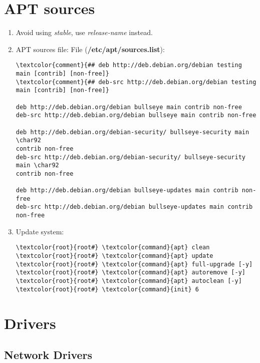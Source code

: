 \documentclass[10pt, a4paper, onecolumn, openany]{book} %
\begin{document}
\section{APT sources}
\begin{enumerate}
    \item Avoid using \textit{stable}, use \textit{release-name} instead.
    \item APT sources file:
\newline File (\textbf{\textcolor{file}{/etc/apt/sources.list}}):
\begin{Verbatim}[commandchars=\\\{\}]
\textcolor{comment}{## deb http://deb.debian.org/debian testing main [contrib] [non-free]}
\textcolor{comment}{## deb-src http://deb.debian.org/debian testing main [contrib] [non-free]}

deb http://deb.debian.org/debian bullseye main contrib non-free
deb-src http://deb.debian.org/debian bullseye main contrib non-free

deb http://deb.debian.org/debian-security/ bullseye-security main \char92
contrib non-free
deb-src http://deb.debian.org/debian-security/ bullseye-security main \char92
contrib non-free

deb http://deb.debian.org/debian bullseye-updates main contrib non-free
deb-src http://deb.debian.org/debian bullseye-updates main contrib non-free
\end{Verbatim}
    \item Update system:
\begin{Verbatim}[commandchars=\\\{\}]
\textcolor{root}{root#} \textcolor{command}{apt} clean
\textcolor{root}{root#} \textcolor{command}{apt} update
\textcolor{root}{root#} \textcolor{command}{apt} full-upgrade [-y]
\textcolor{root}{root#} \textcolor{command}{apt} autoremove [-y]
\textcolor{root}{root#} \textcolor{command}{apt} autoclean [-y]
\textcolor{root}{root#} \textcolor{command}{init} 6
\end{Verbatim}
\end{enumerate}
\section{Drivers}
\subsection{Network Drivers}
\end{document}
